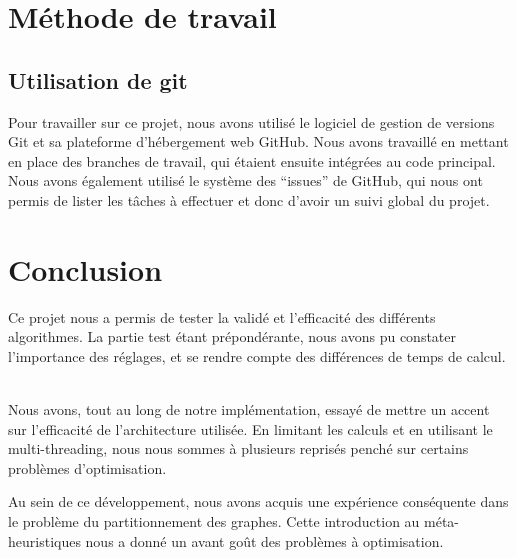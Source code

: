 \documentclass[12pt]{article}
\begin{document}
\newpage

\section{Méthode de travail}
\subsection{Utilisation de git}
Pour travailler sur ce projet, nous avons utilisé le logiciel de gestion de versions Git et sa plateforme d’hébergement web GitHub. Nous avons travaillé en mettant en place des branches de travail, qui étaient ensuite intégrées au code principal. Nous avons également utilisé le système des “issues” de GitHub, qui nous ont permis de lister les tâches à effectuer et donc d’avoir un suivi global du projet.

\section{Conclusion}

Ce projet nous a permis de tester la validé et l'efficacité des différents algorithmes. La partie test étant prépondérante, nous avons pu constater l'importance des réglages, et se rendre compte des différences de temps de calcul.
~\par Nous avons, tout au long de notre implémentation, essayé de mettre un accent sur l'efficacité de l'architecture utilisée. En limitant les calculs et en utilisant le multi-threading, nous nous sommes à plusieurs reprisés penché sur certains problèmes d'optimisation.
~\par Au sein de ce développement, nous avons acquis une expérience conséquente dans le problème du partitionnement des graphes. Cette introduction au méta-heuristiques nous a donné un avant goût des problèmes à optimisation.
		
\end{document}
